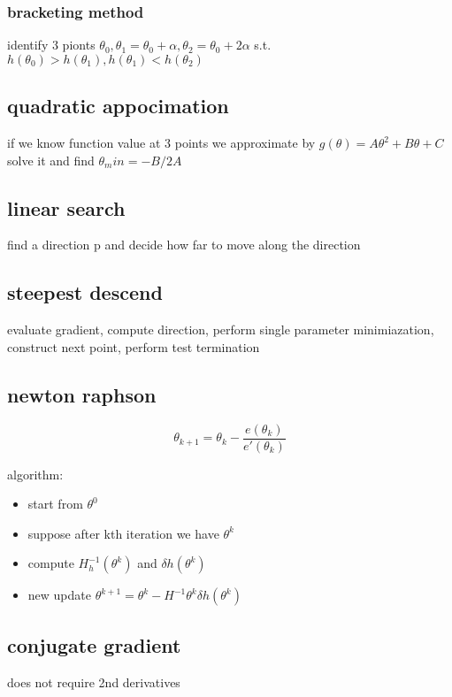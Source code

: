 \documentclass[10pt]{article}
\theoremstyle{break}
\begin{document}
                \subsubsection{bracketing method }
                identify 3 pionts $\theta_0, \theta_1=\theta_0+\alpha , \theta_2= \theta_0+ 2\alpha$
                s.t. $h(\theta_0)>h(\theta_1),h(\theta_1)<h(\theta_2)$

            \subsection{quadratic appocimation}
                if we know function value at 3 points we approximate by $g(\theta)=A\theta^2+B\theta+C$
                solve it and find $\theta_min = -B/2A$

            \subsection{linear search }
                find a direction p and decide how far to move along the direction 
            \subsection{steepest descend}
                evaluate gradient, compute direction, perform single parameter minimiazation, construct next point, perform test termination
                
            \subsection{newton raphson}
            $$\theta_{k+1}=\theta_k-\frac{e(\theta_k)}{e'(\theta_k)}$$

            algorithm:
            \begin{itemize}
                \item start from $\theta^{0}$
                \item suppose after kth iteration we have $\theta^k$
                \item compute $H_h^{-1}(\theta^k)$ and $\delta h (\theta^k)$
                \item new update $\theta^{k+1}=\theta^k - H^{-1}\theta^k\delta h(\theta^k)$
            \end{itemize}
            \subsection{conjugate gradient}
                does not require 2nd derivatives 
\end{document}

